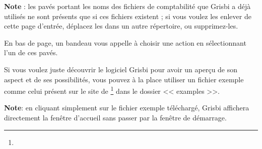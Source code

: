 \newpage

\textbf{Note} : les pavés portant les noms des fichiers de comptabilité que Grisbi a déjà utilisés ne sont présents que si ces fichiers existent ; si vous voulez les enlever de cette page d'entrée, déplacez les dans un autre répertoire, ou supprimez-les.


En bas de page, un bandeau vous appelle à choisir une action en sélectionnant l'un de ces pavés.


Si vous voulez juste découvrir le logiciel Grisbi pour avoir un aperçu de son aspect et de ses possibilités, vous pouvez à la place utiliser un fichier exemple comme celui présent sur le site de \footnote{\urlSourceForgeDocumentation{}} dans le dossier << \textsf{examples} >>.		%


\textbf{Note}: en cliquant simplement sur le fichier exemple téléchargé, Grisbi affichera directement la fenêtre  d'accueil %
 sans passer par la fenêtre de démarrage.

